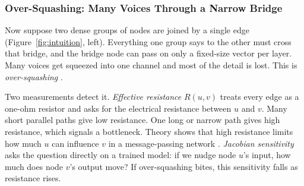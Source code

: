\subsubsection{Over-Squashing: Many Voices Through a Narrow Bridge}
Now suppose two dense groups of nodes are joined by a single edge (Figure~\ref{fig:intuition}, left). Everything one group says to the other must cross that bridge, and the bridge node can pass on only a fixed-size vector per layer. Many voices get squeezed into one channel and most of the detail is lost. This is \emph{over-squashing} \citep{alon2021,topping2022}.

Two measurements detect it. \emph{Effective resistance} $R(u,v)$ treats every edge as a one-ohm resistor and asks for the electrical resistance between $u$ and $v$. Many short parallel paths give low resistance. One long or narrow path gives high resistance, which signals a bottleneck. Theory shows that high resistance limits how much $u$ can influence $v$ in a message-passing network \citep{digiovanni2023,black2023}. \emph{Jacobian sensitivity} asks the question directly on a trained model: if we nudge node $u$'s input, how much does node $v$'s output move? If over-squashing bites, this sensitivity falls as resistance rises.

